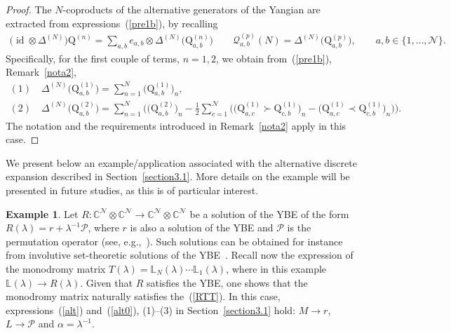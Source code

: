 \documentclass[pdftex]{sigma}
\numberwithin{equation}{section}
\theoremstyle{definition}
\newtheorem{exam}[thm]{Example}
\newcommand{\id}{\operatorname{id}}
\begin{document}
\begin{proof}
The $N$-coproducts of the alternative generators  of the Yangian are extracted from expressions~(\ref{pre1b}), by recalling
\begin{gather*}
\bigl(\id \otimes \Delta^{(N)}\bigr){\mathrm Q}^{(n)}= \sum_{a, b} e_{a,b} \otimes \Delta^{(N)}\bigl({\mathrm Q}_{a,b}^{(n)}\bigr) \qquad {\mathcal Q}_{a,b}^{(p)}(N) = \Delta^{(N)}\bigl({\mathrm Q}_{a,b}^{(p)}\bigr),\qquad\!
a,b \in \{1, \dots, {\mathcal N}\}.
\end{gather*}
Specifically, for the first couple of terms, $n=1, 2$, we obtain from~(\ref{pre1b}), Remark~\ref{nota2},
\begin{gather*}
(1)\quad \Delta^{(N)}\bigl({\mathrm Q}^{(1)}_{a,b}\bigr) = \sum_{n=1}^N\bigl({\mathrm Q}^{(1)}_{a,b}\bigr)_n,\\
(2) \quad \Delta^{(N)}\bigl({\mathrm Q}^{(2)}_{a,b}\bigr) = \sum_{n=1}^N \bigl( \bigl( {\mathrm Q}^{(2)}_{a,b}\bigr)_n -
\frac{1}{2} \sum_{c =1}^{\mathcal N} \bigl( \bigl({\mathrm Q}^{(1)}_{a,c} \succ {\mathrm Q}^{(1)}_{c,b}\bigr)_n- \bigl({\mathrm Q}^{(1)}_{a,c} \prec {\mathrm Q}^{(1)}_{c,b}\bigr)_n \bigr)\bigr).
\end{gather*}
The notation and the requirements introduced in Remark~\ref{nota2} apply in this case.
\end{proof}

We present below an example/application associated with the alternative discrete expansion described in Section~\ref{section3.1}. More details on the example will be presented in future studies, as this is of particular interest.
\begin{exam}{\label{e1}} Let $R\colon {\mathbb C}^{\mathcal N} \otimes {\mathbb C}^{\mathcal N} \to {\mathbb C}^{\mathcal N} \otimes {\mathbb C}^{\mathcal N} $ be a solution of the YBE of the form $R(\lambda) = r + \lambda^{-1} {\mathcal P}$, where $r$ is also a solution of the YBE and $ {\mathcal P}$ is the permutation operator (see, e.g.,~\cite{Doikoutw, DoiSmo2, DoiSmo1}). Such solutions can be obtained for instance from involutive set-theoretic solutions of the YBE~\cite{DoiSmo1, Drin}. Recall now the expression of the monodromy matrix $T(\lambda) = {\mathbb L}_N(\lambda) \cdots {\mathbb L}_1(\lambda)$, where in this example ${\mathbb L}(\lambda) \to R(\lambda)$. Given that $R$ satisfies the YBE, one shows that the monodromy matrix naturally satisfies the~(\ref{RTT}). In this case, expressions~(\ref{alt}) and~(\ref{alt0}), (1)--(3) in Section~\ref{section3.1} hold: $M \to r$, $L \to {\mathcal P}$ and $\alpha = \lambda^{-1}$.
\end{exam}
\end{document}
